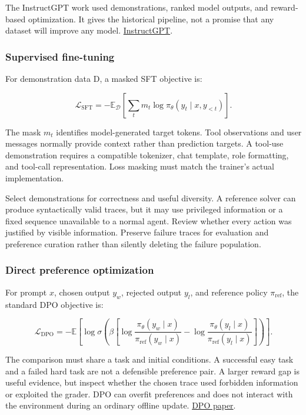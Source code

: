 \documentclass[
  11pt,
  letterpaper,
]{article}
\begin{document}
The InstructGPT work used demonstrations, ranked model outputs, and
reward-based optimization. It gives the historical pipeline, not a
promise that any dataset will improve any model.
\href{https://arxiv.org/abs/2203.02155}{InstructGPT}.

\subsubsection{Supervised fine-tuning}\label{supervised-fine-tuning}

For demonstration data D, a masked SFT objective is:

\[\mathcal{L}_{\mathrm{SFT}}=-\mathbb{E}_{\mathcal{D}}\left[\sum_t m_t\log\pi_\theta(y_t\mid x,y_{<t})\right].\]

The mask \(m_t\) identifies model-generated target tokens. Tool
observations and user messages normally provide context rather than
prediction targets. A tool-use demonstration requires a compatible
tokenizer, chat template, role formatting, and tool-call representation.
Loss masking must match the trainer's actual implementation.

Select demonstrations for correctness and useful diversity. A reference
solver can produce syntactically valid traces, but it may use privileged
information or a fixed sequence unavailable to a normal agent. Review
whether every action was justified by visible information. Preserve
failure traces for evaluation and preference curation rather than
silently deleting the failure population.

\subsubsection{Direct preference
optimization}\label{direct-preference-optimization}

For prompt \(x\), chosen output \(y_w\), rejected output \(y_l\), and
reference policy \(\pi_{\mathrm{ref}}\), the standard DPO objective is:

\[\mathcal{L}_{\mathrm{DPO}}=-\mathbb{E}\left[\log\sigma\left(\beta\left[\log\frac{\pi_\theta(y_w\mid x)}{\pi_{\mathrm{ref}}(y_w\mid x)}-\log\frac{\pi_\theta(y_l\mid x)}{\pi_{\mathrm{ref}}(y_l\mid x)}\right]\right)\right].\]

The comparison must share a task and initial conditions. A successful
easy task and a failed hard task are not a defensible preference pair. A
larger reward gap is useful evidence, but inspect whether the chosen
trace used forbidden information or exploited the grader. DPO can
overfit preferences and does not interact with the environment during an
ordinary offline update. \href{https://arxiv.org/abs/2305.18290}{DPO
paper}.
\end{document}
